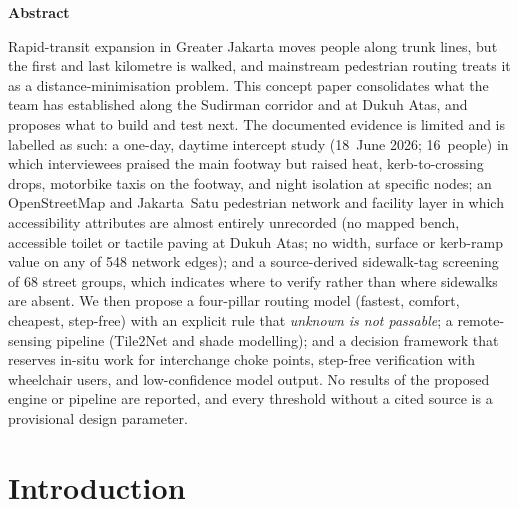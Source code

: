 \documentclass[11pt,a4paper]{article}
\begin{document}
\vspace{0.4em}
\begin{tcolorbox}[enhanced,colback=pijaklight,colframe=pijaklight,boxrule=0pt,arc=2mm,
  left=10pt,right=10pt,top=8pt,bottom=8pt]
\textbf{\color{pijakblue}Abstract}\par\smallskip
\small
Rapid-transit expansion in Greater Jakarta moves people along trunk lines, but the first and last
kilometre is walked, and mainstream pedestrian routing treats it as a distance-minimisation
problem. This concept paper consolidates what the team has established along the Sudirman
corridor and at Dukuh Atas, and proposes what to build and test next. The documented evidence is
limited and is labelled as such: a one-day, daytime intercept study (18~June 2026; 16~people)
in which interviewees praised the main footway but raised heat, kerb-to-crossing drops, motorbike
taxis on the footway, and night isolation at specific nodes; an OpenStreetMap and Jakarta~Satu
pedestrian network and facility layer in which accessibility attributes are almost entirely
unrecorded (no mapped bench, accessible toilet or tactile paving at Dukuh Atas; no width, surface or
kerb-ramp value on any of 548 network edges); and a source-derived sidewalk-tag screening of 68
street groups, which indicates where to verify rather than where sidewalks are absent. We then
propose a four-pillar routing model (fastest, comfort, cheapest, step-free) with an explicit rule
that \emph{unknown is not passable}; a remote-sensing pipeline (Tile2Net and shade modelling); and
a decision framework that reserves in-situ work for interchange choke points, step-free
verification with wheelchair users, and low-confidence model output. No results of the proposed
engine or pipeline are reported, and every threshold without a cited source is a provisional
design parameter.
\end{tcolorbox}

\smallskip
{}

\newpage
\setcounter{tocdepth}{1}
\tableofcontents

\section{Introduction}\label{sec:intro}
\end{document}

